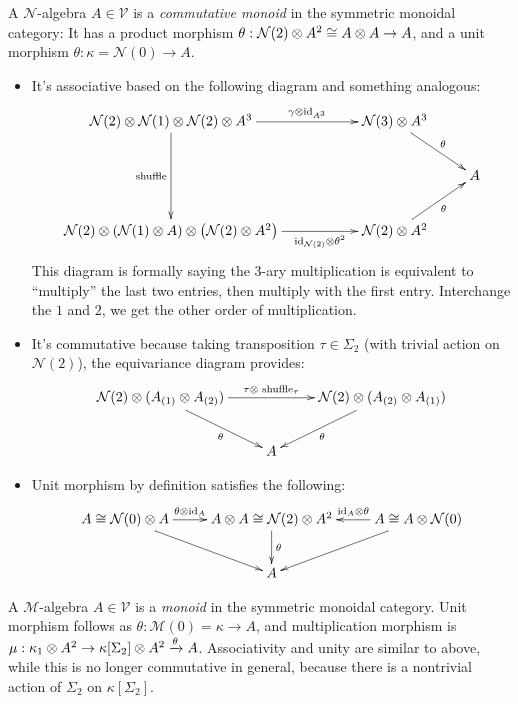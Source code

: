 \documentclass{article}
\begin{document}
\begin{exmp}
    A $\mathcal{N}$-algebra $A\in\mathcal{V}$ is a \emph{commutative monoid} in the symmetric monoidal category: It has a product morphism $\theta:\mathcal{N}(2)\otimes A^2\cong A\otimes A\rightarrow A$, and a unit morphism $\theta:\kappa=\mathcal{N}(0)\rightarrow A$.
    \begin{itemize}
        \item It's associative based on the following diagram and something analogous:
        \[\xymatrix{
            \mathcal{N}(2)\tensor \mathcal{N}(1)\tensor\mathcal{N}(2)\tensor A^3\ar[dd]_-{\text{shuffle}}\ar[rr]^-{\gamma\tensor \id_{A^3}} && \mathcal{N}(3)\tensor A^3 \ar[dr]^-{\theta}\\
            &&& A\\
            \mathcal{N}(2)\tensor \left(\mathcal{N}(1)\tensor A\right)\tensor \left(\mathcal{N}(2)\tensor A^2\right) \ar[rr]_-{\id_{\mathcal{N}(2)}\tensor \theta^2} && \mathcal{N}(2)\tensor A^2 \ar[ur]_-{\theta}
        }\]
        This diagram is formally saying the 3-ary multiplication is equivalent to ``multiply'' the last two entries, then multiply with the first entry. Interchange the $1$ and $2$, we get the other order of multiplication.
        \item It's commutative because taking transposition $\tau\in\Sigma_2$ (with trivial action on $\mathcal{N}(2)$), the equivariance diagram provides:
        \[\xymatrix{
            \mathcal{N}(2)\tensor (A_{(1)}\tensor A_{(2)}) \ar[dr]_-{\theta} \ar[rr]^-{\tau\tensor \text{ shuffle}_{\tau}} && \mathcal{N}(2)\tensor (A_{(2)}\tensor A_{(1)}) \ar[dl]^-{\theta}\\
            & A
        }\]
        \item Unit morphism by definition satisfies the following:
        \[\xymatrix{
            A\cong \mathcal{N}(0) \tensor A \ar[dr]_-{} \ar[r]^-{\theta\tensor \id_A} & A\tensor A \cong \mathcal{N}(2)\tensor A^2 \ar[d]^-{\theta} & A\cong A\tensor \mathcal{N}(0) \ar[l]_-{\id_A\tensor \theta} \ar[dl]^-{}\\
            & A
        }\]
    \end{itemize}
\end{exmp}

\begin{exmp}
A $\mathcal{M}$-algebra $A\in\mathcal{V}$ is a \emph{monoid} in the symmetric monoidal category. Unit morphism follows as $\theta:\mathcal{M}(0)=\kappa\rightarrow A$, and multiplication morphism is $\mu:\kappa_1\otimes A^2\rightarrow \kappa[\Sigma_2]\otimes A^2\xrightarrow{\theta}A$. Associativity and unity are similar to above, while this is no longer commutative in general, because there is a nontrivial action of $\Sigma_2$ on $\kappa[\Sigma_2]$.
\end{exmp}
\end{document}
